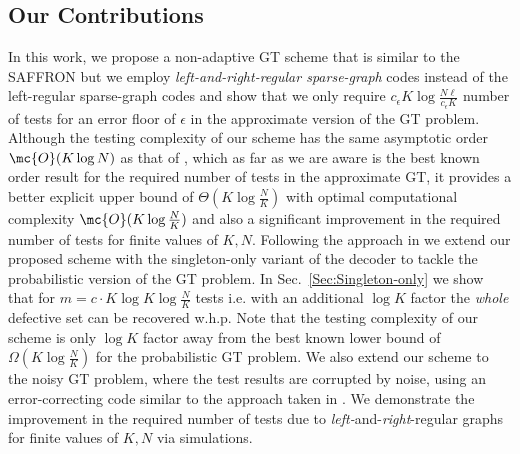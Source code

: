\documentclass[conference,twocolumn]{IEEEtran}
\def\ceps{c_{\epsilon}}
\begin{document}
\subsection*{Our Contributions}
In this work, we propose a non-adaptive GT scheme that is similar to the SAFFRON but we employ \textit{left-and-right-regular sparse-graph} codes instead of the left-regular sparse-graph codes and show that we only require $\ceps K\log \frac{N\ell}{\ceps K}$ number of tests for an error floor of $\epsilon$ in the approximate version of the GT problem. Although the testing complexity of our scheme has the same asymptotic order $\mc{O}(K\log N)$ as that of \cite{lee2015saffron}, which as far as we are aware is the best known order result for the required number of tests in the approximate GT, it provides a better explicit upper bound of $\Theta(K\log \frac{N}{K})$ with optimal computational complexity $\mc{O}(K\log \frac{N}{K})$ and also a significant improvement in the required number of tests for finite values of $K,N$. 
Following the approach in \cite{lee2015saffron} we extend our proposed scheme with the singleton-only variant of the decoder to tackle the probabilistic version of the GT problem. In Sec.~\ref{Sec:Singleton-only} we show that for $m=c\cdot K\log K \log \frac{N}{K}$ tests i.e. with an additional $\log K$ factor the \textit{whole} defective set can be recovered w.h.p. Note that the testing complexity of our scheme is only $\log K$ factor away from the best known lower bound of $\Omega(K\log \frac{N}{K})$ \cite{chan2014non} for the probabilistic GT problem. We also extend our scheme to the noisy GT problem, where the test results are corrupted by noise, using an error-correcting code similar to the approach taken in \cite{lee2015saffron}. We demonstrate the improvement in the required number of tests due to \emph{left-}and-\emph{right}-regular graphs  for finite values of $K, N$ via simulations.
\end{document}
